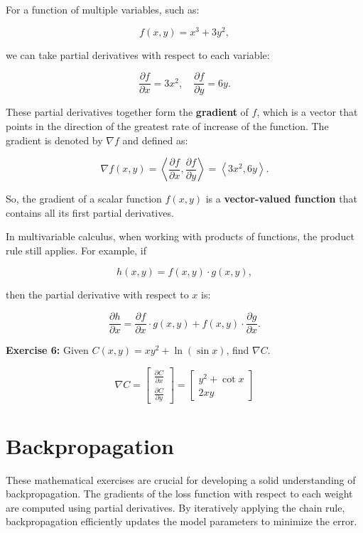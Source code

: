 For a function of multiple variables, such as:

\[
f(x, y) = x^3 + 3y^2,
\]

we can take partial derivatives with respect to each variable:

\[
\frac{\partial f}{\partial x} = 3x^2, \quad \frac{\partial f}{\partial y} = 6y.
\]

These partial derivatives together form the \textbf{gradient} of \(f\), which is a vector that points in the direction of the greatest rate of increase of the function. The gradient is denoted by \(\nabla f\) and defined as:

\[
\nabla f(x, y) = \left\langle \frac{\partial f}{\partial x}, \frac{\partial f}{\partial y} \right\rangle = \left\langle 3x^2, 6y \right\rangle.
\]

So, the gradient of a scalar function \(f(x, y)\) is a \textbf{vector-valued function} that contains all its first partial derivatives.

\bigskip

In multivariable calculus, when working with products of functions, the product rule still applies. For example, if

\[
h(x, y) = f(x, y) \cdot g(x, y),
\]

then the partial derivative with respect to \(x\) is:

\[
\frac{\partial h}{\partial x} = \frac{\partial f}{\partial x} \cdot g(x, y) + f(x, y) \cdot \frac{\partial g}{\partial x}.
\]

\textbf{Exercise 6:} Given $C(x, y) = xy^2 + \ln (\sin x)$, find $\nabla C$.

\[
\nabla C = 
\begin{bmatrix}
    \frac{\partial C}{\partial x} \\
    \frac{\partial C}{\partial y}
\end{bmatrix}
=
\begin{bmatrix}
    y^2 + \cot x \\
    2xy
\end{bmatrix}
\]

\section{Backpropagation}

These mathematical exercises are crucial for developing a solid understanding of backpropagation. The gradients of the loss function with respect to each weight are computed using partial derivatives. By iteratively applying the chain rule, backpropagation efficiently updates the model parameters to minimize the error.

